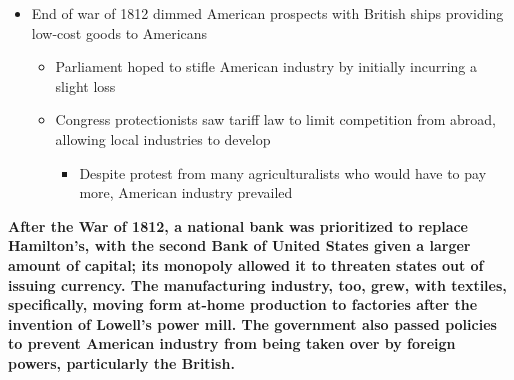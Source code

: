 \documentclass[a4paper]{article}
\begin{document}
{\begin{itemize}
\begin{itemize}
\begin{itemize}
            \end{itemize}
            \item End of war of 1812 dimmed American prospects with British ships providing low-cost goods to Americans
            \begin{itemize}
                \item Parliament hoped to stifle American industry by initially incurring a slight loss
                \item Congress protectionists saw tariff law to limit competition from abroad, allowing local industries to develop
                \begin{itemize}
                    \item Despite protest from many agriculturalists who would have to pay more, American industry prevailed
                \end{itemize}
            \end{itemize}
        \end{itemize}
    \end{itemize}
    \textbf{After the War of 1812, a national bank was prioritized to replace Hamilton's, with the second Bank of United States given a larger amount of capital; its monopoly allowed it to threaten states out of issuing currency. The manufacturing industry, too, grew, with textiles, specifically, moving form at-home production to factories after the invention of Lowell's power mill. The government also passed policies to prevent American industry from being taken over by foreign powers, particularly the British.}}
\end{document}
